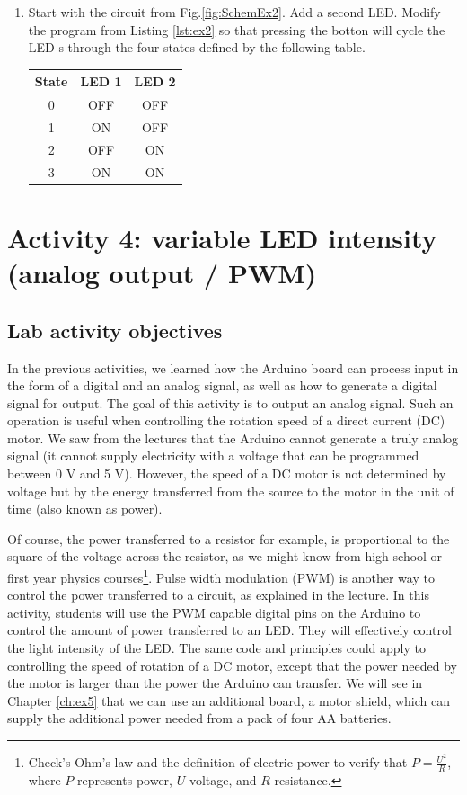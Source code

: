 \documentclass[12pt]{book}
\begin{document}
\begin{enumerate}[1.]
\item Start with the circuit from Fig.\ref{fig:SchemEx2}. Add a second LED. Modify the program from Listing \ref{lst:ex2} so that pressing the botton will cycle the LED-s through the four states defined by the following table.
  
  \begin{tabular}{ccc}
    State & LED 1 & LED 2 \\ \hline
    0 & OFF & OFF \\
    1 & ON & OFF \\
    2 & OFF & ON \\
    3 & ON & ON
  \end{tabular}

\end{enumerate}



\chapter{Activity 4: variable LED intensity (analog output /
  PWM)} \label{se:ch4} 

\section{Lab activity objectives}

In the previous activities, we learned how the Arduino board can
process input in the form of a digital and an analog signal, as well
as how to generate a digital signal for output. The goal of this
activity is to output an analog signal. Such an operation is useful
when controlling the rotation speed of a direct current (DC) motor. We
saw from the lectures that the Arduino cannot generate a
truly analog signal (it cannot supply electricity with a voltage
that can be programmed between 0 V and 5 V). However, the speed of a DC
motor is not determined by voltage but by the energy 
transferred from the source to the motor in the unit of time (also
known as power). 

Of course, the power transferred to a resistor for example, is
proportional to the square of the voltage across the resistor, as we
might know from high school or first year physics
courses\footnote{Check's Ohm's law and the definition of electric
  power to verify that $P = \frac{U^2}{R}$, where $P$ represents
  power, $U$ voltage, and $R$ resistance.}. Pulse width
modulation (PWM) is another way to control the power transferred to a
circuit, as explained in the lecture. In this activity, students will
use the PWM capable digital pins on the Arduino to control the amount
of power transferred to an LED. They will effectively control the
light intensity of the LED. The same code and principles could apply
to controlling the speed of rotation of a DC motor, except that the
power needed by the motor is larger than the power the Arduino can
transfer. We will see in Chapter \ref{ch:ex5} that we can use an
additional board, a motor shield, which can supply the additional
power needed from a pack of four AA batteries. 
\end{document}
